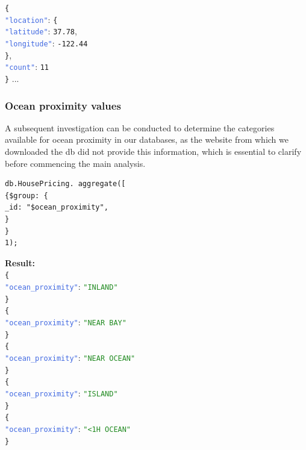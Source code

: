 \documentclass{Configuration_Files/PoliMi3i_thesis}
\newcommand{\jsonkey}[1]{\textcolor{RoyalBlue}{\texttt{"#1"}}}
\newcommand{\jsonstring}[1]{\textcolor{ForestGreen}{\texttt{"#1"}}}
\newcommand{\jsonnumber}[1]{\textcolor{BrickRed}{\texttt{#1}}}
\begin{document}
\noindent
\texttt{\{} \\
\jsonkey{location}: \texttt{\{} \\
\hspace*{1em} \jsonkey{latitude}: \jsonnumber{37.78}, \\
\hspace*{1em} \jsonkey{longitude}: \jsonnumber{-122.44} \\
\texttt{\}}, \\
\jsonkey{count}: \jsonnumber{11} \\
\texttt{\}}
... 

\subsubsection*{Ocean proximity values}
A subsequent investigation can be conducted to determine the categories available for ocean proximity in our databases, as the website from which we downloaded the db did not provide this information, which is essential to clarify before commencing the main analysis.

\begin{lstlisting}[language=MongoDB]
db.HousePricing. aggregate([
{$group: {
_id: "$ocean_proximity",
}
}
1);
\end{lstlisting}

\textbf{Result:} \\
\noindent
\texttt{\{} \\
\jsonkey{ocean\_proximity}: \jsonstring{INLAND} \\
\texttt{\}} \\

\noindent
\texttt{\{} \\
\jsonkey{ocean\_proximity}: \jsonstring{NEAR BAY} \\
\texttt{\}} \\

\noindent
\texttt{\{} \\
\jsonkey{ocean\_proximity}: \jsonstring{NEAR OCEAN} \\
\texttt{\}} \\

\noindent
\texttt{\{} \\
\jsonkey{ocean\_proximity}: \jsonstring{ISLAND} \\
\texttt{\}} \\

\noindent
\texttt{\{} \\
\jsonkey{ocean\_proximity}: \jsonstring{<1H OCEAN} \\
\texttt{\}} \\
\end{document}
